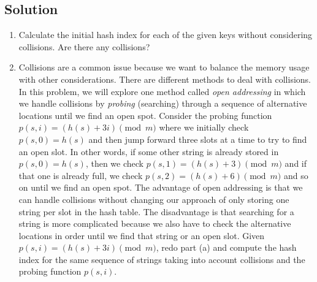 \documentclass[11pt]{article}
\begin{document}
    \subsection*{Solution}
    \begin{enumerate}[label=(\alph*)]
        \item Calculate the initial hash index for each of the given keys without considering collisions. Are there any collisions?
        \item Collisions are a common issue because we want to balance the memory usage with other considerations. There are different methods to deal with collisions. In this problem, we will explore one method called \textit{open addressing} in which we handle collisions by \textit{probing} (searching) through a sequence of alternative locations until we find an open spot. Consider the probing function $p(s, i) = (h(s) + 3i) \pmod{m}$ where we initially check $p(s, 0) = h(s)$ and then jump forward three slots at a time to try to find an open slot. In other words, if some other string is already stored in $p(s, 0) = h(s)$, then we check $p(s, 1) = (h(s) + 3) \pmod{m}$ and if that one is already full, we check $p(s, 2) = (h(s) + 6) \pmod{m}$ and so on until we find an open spot. The advantage of open addressing is that we can handle collisions without changing our approach of only storing one string per slot in the hash table. The disadvantage is that searching for a string is more complicated because we also have to check the alternative locations in order until we find that string or an open slot. Given $p(s, i) = (h(s) + 3i) \pmod{m}$, redo part (a) and compute the hash index for the same sequence of strings taking into account collisions and the probing function $p(s, i)$.
    \end{enumerate}
\end{document}
